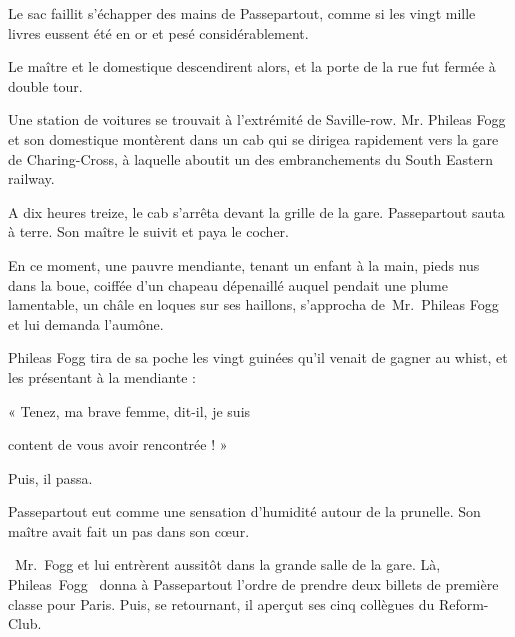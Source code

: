 \documentclass[]{book}
\begin{document}
               Le sac faillit s'échapper des mains de 
               Passepartout, comme si les vingt mille
               livres eussent été en or et pesé considérablement.
            
               Le maître et le domestique descendirent 
               alors, et la porte de la rue fut fermée à
               double tour.
            
               Une station de voitures se trouvait à
               l'extrémité de Saville-row. Mr. Phileas
               Fogg et son domestique montèrent dans 
               un cab qui se dirigea rapidement vers la 
               gare de Charing-Cross\index[placeName]{{}}, à laquelle aboutit
               un des embranchements du South Eastern 
               railway.
            
               A dix heures treize, le cab s'arrêta devant la grille de la gare. Passepartout 
               sauta à terre. Son maître le suivit et paya 
               le cocher.
            
               En ce moment, une pauvre mendiante,
               tenant un enfant à la main, pieds nus 
               dans la boue, coiffée d'un chapeau dépenaillé auquel pendait une plume lamentable, un châle en loques sur ses haillons,
               s'approcha de Mr. Phileas Fogg et lui demanda l'aumône.
            
               Phileas Fogg tira de sa poche les vingt
               guinées qu'il venait de gagner au whist, 
               et les présentant à la mendiante :
            
               « Tenez, ma brave femme, dit-il, je suis
                  
               
                  
               content de vous avoir rencontrée ! » \newline
            
               Puis, il passa.
            
               Passepartout eut comme une sensation
               d'humidité autour de la prunelle. Son
               maître avait fait un pas dans son cœur.
            
                Mr. Fogg et lui entrèrent aussitôt dans la
               grande salle de la gare. Là, Phileas Fogg 
               donna à Passepartout l'ordre de prendre 
               deux billets de première classe pour Paris. Puis, se retournant, il aperçut ses cinq 
               collègues du Reform-Club.
            
\end{document}
